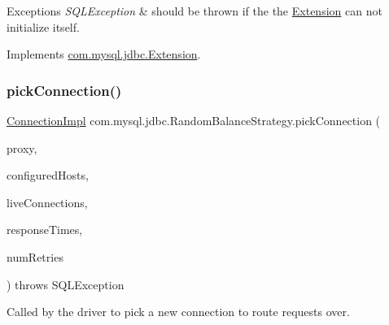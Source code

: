 \begin{DoxyExceptions}{Exceptions}
{\em S\+Q\+L\+Exception} & should be thrown if the the \mbox{\hyperlink{interfacecom_1_1mysql_1_1jdbc_1_1_extension}{Extension}} can not initialize itself. \\
\hline
\end{DoxyExceptions}


Implements \mbox{\hyperlink{interfacecom_1_1mysql_1_1jdbc_1_1_extension_a79427811058193260bd4df0c38414e88}{com.\+mysql.\+jdbc.\+Extension}}.

\mbox{\label{classcom_1_1mysql_1_1jdbc_1_1_random_balance_strategy_ab621c7b0143450318d7bb73a3a176651}} 
\subsubsection{\texorpdfstring{pick\+Connection()}{pickConnection()}}
{\footnotesize\ttfamily \mbox{\hyperlink{classcom_1_1mysql_1_1jdbc_1_1_connection_impl}{Connection\+Impl}} com.\+mysql.\+jdbc.\+Random\+Balance\+Strategy.\+pick\+Connection (\begin{DoxyParamCaption}\item[{\mbox{\hyperlink{classcom_1_1mysql_1_1jdbc_1_1_load_balanced_connection_proxy}{Load\+Balanced\+Connection\+Proxy}}}]{proxy,  }\item[{List$<$ String $>$}]{configured\+Hosts,  }\item[{Map$<$ String, \mbox{\hyperlink{classcom_1_1mysql_1_1jdbc_1_1_connection_impl}{Connection\+Impl}} $>$}]{live\+Connections,  }\item[{long \mbox{[}$\,$\mbox{]}}]{response\+Times,  }\item[{int}]{num\+Retries }\end{DoxyParamCaption}) throws S\+Q\+L\+Exception}

Called by the driver to pick a new connection to route requests over.


